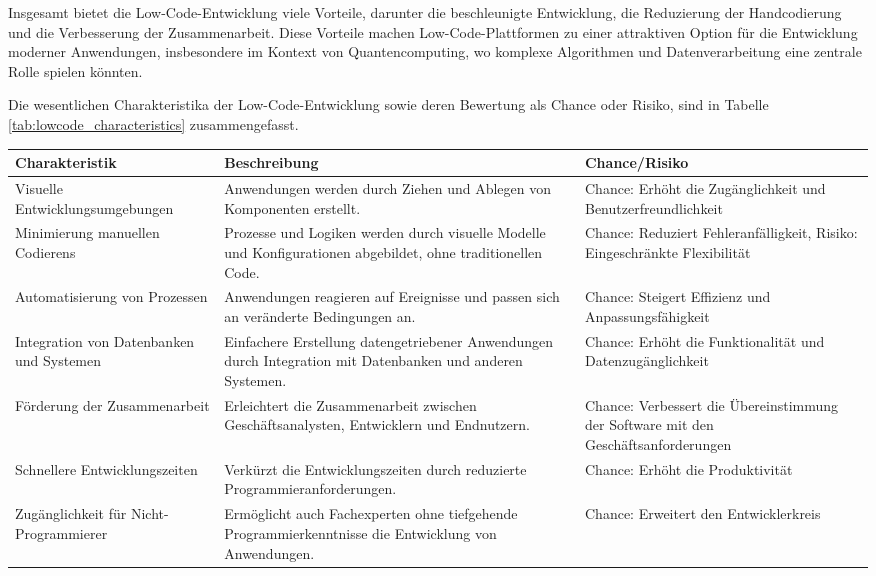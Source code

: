 Insgesamt bietet die Low-Code-Entwicklung viele Vorteile, darunter die beschleunigte Entwicklung, die Reduzierung 
der Handcodierung und die Verbesserung der Zusammenarbeit. Diese Vorteile machen Low-Code-Plattformen zu einer 
attraktiven Option für die Entwicklung moderner Anwendungen, insbesondere im Kontext von Quantencomputing, wo 
komplexe Algorithmen und Datenverarbeitung eine zentrale Rolle spielen könnten.

Die wesentlichen Charakteristika der Low-Code-Entwicklung sowie deren Bewertung als Chance oder Risiko, sind in 
Tabelle \ref{tab:lowcode_characteristics} zusammengefasst.

\begin{table}[h!]
    \centering
    \begin{tabular}{|p{4cm}|p{6cm}|p{4cm}|}
    \hline
    \textbf{Charakteristik} & \textbf{Beschreibung} & \textbf{Chance/Risiko} \\
    \hline
    Visuelle Entwicklungsumgebungen & Anwendungen werden durch Ziehen und Ablegen von Komponenten erstellt. & Chance: Erhöht die Zugänglichkeit und Benutzerfreundlichkeit \\
    \hline
    Minimierung manuellen Codierens & Prozesse und Logiken werden durch visuelle Modelle und Konfigurationen abgebildet, ohne traditionellen Code. & Chance: Reduziert Fehleranfälligkeit, Risiko: Eingeschränkte Flexibilität \\
    \hline
    Automatisierung von Prozessen & Anwendungen reagieren auf Ereignisse und passen sich an veränderte Bedingungen an. & Chance: Steigert Effizienz und Anpassungsfähigkeit \\
    \hline
    Integration von Datenbanken und Systemen & Einfachere Erstellung datengetriebener Anwendungen durch Integration mit Datenbanken und anderen Systemen. & Chance: Erhöht die Funktionalität und Datenzugänglichkeit \\
    \hline
    Förderung der Zusammenarbeit & Erleichtert die Zusammenarbeit zwischen Geschäftsanalysten, Entwicklern und Endnutzern. & Chance: Verbessert die Übereinstimmung der Software mit den Geschäftsanforderungen \\
    \hline
    Schnellere Entwicklungszeiten & Verkürzt die Entwicklungszeiten durch reduzierte Programmieranforderungen. & Chance: Erhöht die Produktivität \\
    \hline
    Zugänglichkeit für Nicht-Programmierer & Ermöglicht auch Fachexperten ohne tiefgehende Programmierkenntnisse die Entwicklung von Anwendungen. & Chance: Erweitert den Entwicklerkreis \\

\end{tabular}
\end{table}
